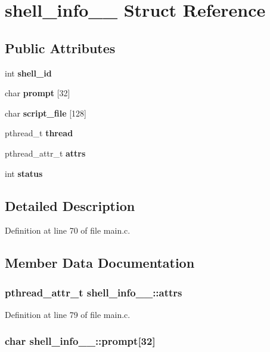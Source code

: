 \section{shell\_\-info\_\-\_\- Struct Reference}
\label{structshell__info____}
\subsection*{Public Attributes}
\begin{DoxyCompactItemize}
\item 
int {\bf shell\_\-id}
\item 
char {\bf prompt} [32]
\item 
char {\bf script\_\-file} [128]
\item 
pthread\_\-t {\bf thread}
\item 
pthread\_\-attr\_\-t {\bf attrs}
\item 
int {\bf status}
\end{DoxyCompactItemize}


\subsection{Detailed Description}


Definition at line 70 of file main.c.

\subsection{Member Data Documentation}
\subsubsection[{attrs}]{\setlength{\rightskip}{0pt plus 5cm}pthread\_\-attr\_\-t {\bf shell\_\-info\_\-\_\-::attrs}}\label{structshell__info_____a93a6af8ad1908b17c3256acced9eba11}


Definition at line 79 of file main.c.
\subsubsection[{prompt}]{\setlength{\rightskip}{0pt plus 5cm}char {\bf shell\_\-info\_\-\_\-::prompt}[32]}\label{structshell__info_____afbed73ddf245e9b210b3e39e74d7c3d9}


